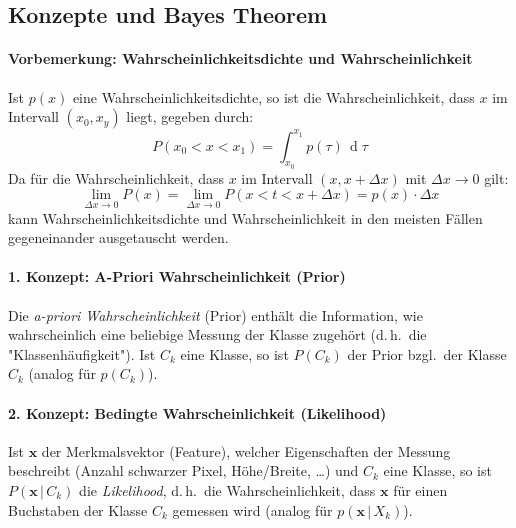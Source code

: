 \documentclass[a4paper, 11pt, accentcolor = tud3b]{tudreport}
\DeclareMathOperator{\total}{d}
\newcommand{\dif}[1]{\,\total#1}
\newcommand{\given}{\,\vert\,}
\renewcommand{\vec}[1]{\boldsymbol{\mathbf{#1}}}
\renewcommand{\dh}{d.\,h.~}
\newcommand{\bzgl}{bzgl.~}
\begin{document}
			\subsection{Konzepte und Bayes Theorem}
				\paragraph{Vorbemerkung: Wahrscheinlichkeitsdichte und Wahrscheinlichkeit}
					Ist \( p(x) \) eine Wahrscheinlichkeitsdichte, so ist die Wahrscheinlichkeit, dass \(x\) im Intervall \( (x_0, x_y) \) liegt, gegeben durch:
					\begin{equation*}
						P(x_0 < x < x_1) = \int_{x_0}^{x_1} \! p(\tau) \dif{\tau}
					\end{equation*}
					Da für die Wahrscheinlichkeit, dass \( x \) im Intervall \( (x, x + \Delta x) \) mit \( \Delta x \to 0 \) gilt:
					\begin{equation*}
						\lim\limits_{\Delta x \to 0} P(x) = \lim\limits_{\Delta x \to 0} P(x < t < x + \Delta x) = p(x) \cdot \Delta x
					\end{equation*}
					kann Wahrscheinlichkeitsdichte und Wahrscheinlichkeit in den meisten Fällen gegeneinander ausgetauscht werden.
			
				\paragraph{1. Konzept: A-Priori Wahrscheinlichkeit (Prior)}
					Die \emph{a-priori Wahrscheinlichkeit} (Prior) enthält die Information, wie wahrscheinlich eine beliebige Messung der Klasse zugehört (\dh die "Klassenhäufigkeit"). Ist \( C_k \) eine Klasse, so ist \( P(C_k) \) der Prior \bzgl der Klasse \( C_k \) (analog für \( p(C_k) \)).
				
				\paragraph{2. Konzept: Bedingte Wahrscheinlichkeit (Likelihood)}
					Ist \(\vec{x}\) der Merkmalsvektor (Feature), welcher Eigenschaften der Messung beschreibt (Anzahl schwarzer Pixel, Höhe/Breite, \dots) und \( C_k \) eine Klasse, so ist \( P(\vec{x} \given C_k) \) die \emph{Likelihood}, \dh die Wahrscheinlichkeit, dass \(\vec{x}\) für einen Buchstaben der Klasse \( C_k \) gemessen wird (analog für \( p(\vec{x} \given X_k) \)).
				
\end{document}
